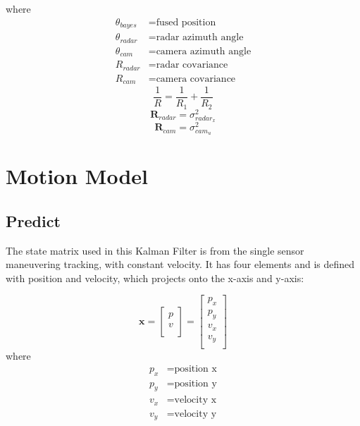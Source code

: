 where
\begin{align*}
    \theta_{bayes} &= \text{fused position}\\
    \theta_{radar} &= \text{radar azimuth angle}\\
    \theta_{cam} &= \text{camera azimuth angle}\\
    R_{radar} &= \text{radar covariance}\\
    R_{cam} &= \text{camera covariance}
\end{align*}
\begin{equation}\label{equ:bayes4}
    \frac{1}{R}=\frac{1}{R_1}+\frac{1}{R_2}
\end{equation}
\begin{equation}\label{equ:2-radar_R}
    \mathbf{R}_{radar} = 
        \sigma_{radar_x}^2 
\end{equation}
\begin{equation}\label{equ:2-R_cam}
    \mathbf{R}_{cam} = 
        \sigma_{cam_u}^2
\end{equation}


\section{Motion Model}\label{sec:2-kalman_filter}

\subsection{Predict}\label{sec:2-predict}
The state matrix used in this Kalman Filter \cite{kalman} is from the single sensor maneuvering tracking, with constant velocity.
It has four elements and is defined with position and velocity, which projects onto the x-axis and y-axis:

\begin{equation}\label{equ:state_eq}
    \mathbf{x} = 
        \begin{bmatrix} 
        p \\ 
        v \\

        \end{bmatrix} = 
        \begin{bmatrix} 
        p_x \\ 
        p_y \\ 
        v_x \\ 
        v_y \\
        \end{bmatrix}
\end{equation}
where
\begin{align*}
    p_x &=\text{position x}\\
    p_y &=\text{position y}\\
    v_x &=\text{velocity x}\\
    v_y &=\text{velocity y}\\
\end{align*}

